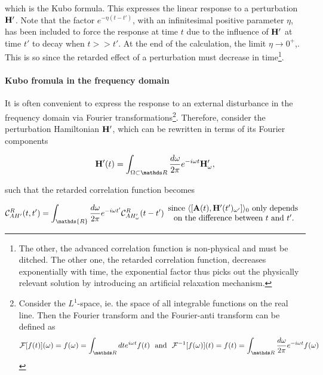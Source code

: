\documentclass{homework}
\begin{document}
which is the Kubo formula. This expresses the linear response to a perturbation ${\bf H}'$. Note that the factor $e^{-\eta(t-t')}$, with an infinitesimal positive parameter $\eta$, has been included to force the response at time $t$ due to the influence of ${\bf H}'$ at time $t'$ to decay when $t >> t'$. At the end of the calculation, the limit $\eta \rightarrow 0^+$,. This is so since the retarded effect of a perturbation must decrease in time\footnote{The other, the advanced correlation function is non-physical and must be ditched. The other one, the retarded correlation function, decreases exponentially with time, the exponential factor thus picks out the physically relevant solution by introducing an artificial relaxation mechanism.}. \\

\paragraph{\textbf{Kubo fromula in the frequency domain}}

It is often convenient to express the response to an external disturbance in the frequency domain via Fourier transformations\footnote{Consider the $L^1$-space, ie. the space of all integrable functions on the real line. Then the Fourier transform and the Fourier-anti transform can be defined as 
\begin{align}
    \mathcal{F}[f(t)](\omega) = f(\omega) = \int_{\R} dt e^{i\omega t} f(t) \blanky \textnormal{ and } \blanky \mathcal{F}^{-1}[f(\omega)](t) = f(t) = \int_{\R} \frac{d\omega}{2\pi} e^{-i\omega t} f(\omega)
\end{align}

}. Therefore, consider the perturbation Hamiltonian ${\bf H}'$, which can be rewritten in terms of its Fourier components 

\begin{equation}
    \Hamiltonian'(t) = \int_{\Omega \subset \R} \frac{d\omega}{2\pi} e^{-i\omega t} \Hamiltonian'_\omega,
\end{equation}

such that the retarded correlation function becomes 

\begin{equation}
    \mathcal{C}_{AH'}^{R}(t,t') = \int_{\mathds{R}} \frac{d\omega}{2\pi} e^{-i\omega t'} \mathcal{C}_{AH'_\omega}^{R}(t-t') \begin{array}{c}
         \textnormal{since $\langle[{{\bf A}}(t), \Hamiltonian'(t')_{\omega'}]\rangle_{0}$ only depends } \\
         \textnormal{ on the difference between $t$ and $t'$. }
    \end{array}
\end{equation}
\end{document}
